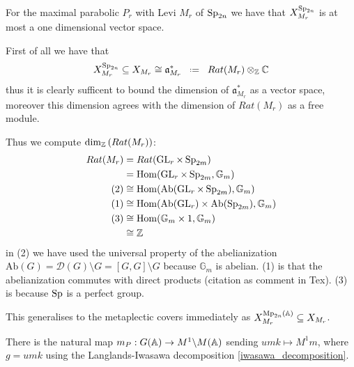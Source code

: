 \begin{example}
    For the maximal parabolic \(P_r\) with Levi \(M_r\) of \(\operatorname{Sp}_{2n}\) we have that \( X_{M_r}^{\operatorname{Sp}_{2n}}\) is at most a one dimensional \C vector space. 

    First of all we have that \cite[I.1.4]{moeglinSpectralDecompositionEisenstein1995}
         \[ X_{M_r}^{\Sp_{2n}} \subseteq X_{M_r} \cong \mathfrak{a}_{M_r}^*\defeq Rat(M_r) \tensor_\Z \C\]
        thus it is clearly sufficent to bound the dimension of \(\mathfrak{a}_{M_r}^*\) as a \C vector space, moreover this dimension agrees with the dimension of \(Rat(M_r)\) as a free \Z module. 

        Thus we compute \(\dim_\Z(Rat(M_r))\):
        \begin{equation*}
            \begin{aligned}
                Rat(M_r) &= Rat(\GL_r \times \Sp_{2m}) \\
                         &= \Hom(\GL_r \times \Sp_{2m}, \mathbb{G}_m) \\
                         (2)&\cong \Hom(\mathrm{Ab}(\GL_r \times \Sp_{2m}), \mathbb{G}_m) \\
                         (1)&\cong \Hom(\mathrm{Ab}(\GL_r) \times \mathrm{Ab}(\Sp_{2m}), \mathbb{G}_m) \\
                         (3)&\cong \Hom(\mathbb{G}_m \times 1, \mathbb{G}_m) \\
                         &\cong \Z
            \end{aligned}
        \end{equation*}
        in (2) we have used the universal property of the abelianization \(\mathrm{Ab}(G) = \mathcal{D}(G) \setminus G = [G, G] \setminus G \) because \(\mathbb{G}_m\) is abelian. (1) is that the abelianization commutes with direct products (citation as comment in Tex). (3) is because \(\operatorname{Sp}\) is a perfect group.
\end{example}

\begin{remark}
    This generalises to the metaplectic covers immediately as \( X_{M_r}^{\Mp_{2n}(\A)} \subseteq X_{M_r}\).
\end{remark}
There is the natural map \(m_P: G(\A) \to M^1 \backslash M(\A)\) sending \(umk \mapsto M^1 m\), where \(g = umk\) using the Langlands-Iwasawa decomposition \ref{iwasawa_decomposition}.

